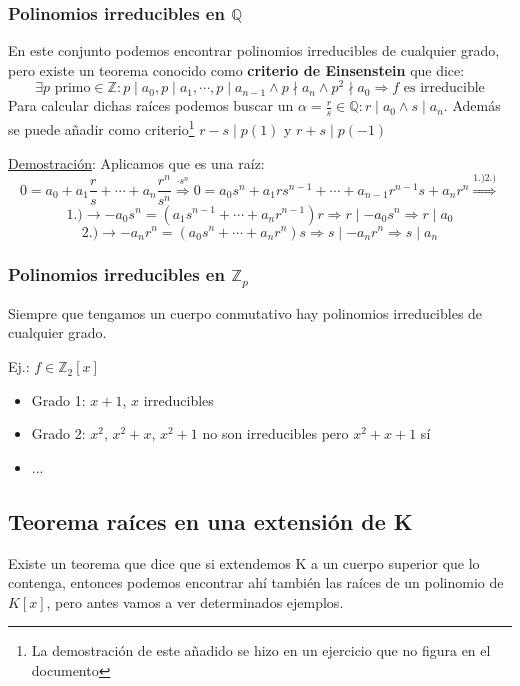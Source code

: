 \documentclass[10pt,a4paper,openright]{book}
\theoremstyle{break}
\begin{document}
\subsubsection*{Polinomios irreducibles en $\mathbb Q$}
En este conjunto podemos encontrar polinomios irreducibles de cualquier grado, pero existe un teorema conocido como \textbf{criterio de Einsenstein} que dice:
$$\exists p\mbox{ primo}\in \mathbb Z: p\mid a_0, p\mid a_1,\cdots, p\mid a_{n-1}\wedge p\nmid a_n \wedge p^2\nmid a_0\Rightarrow f\mbox{ es irreducible}$$
Para calcular dichas raíces podemos buscar un $\alpha=\frac{r}{s}\in \mathbb Q: r\mid a_0\wedge s\mid a_n$. Además se puede añadir como criterio\footnote{La demostración de este añadido se hizo en un ejercicio que no figura en el documento} $r-s\mid p(1)$ y $r+s\mid p(-1)$\par
\underline{Demostración}:
Aplicamos que es una raíz:
$$0=a_0+a_1\frac{r}{s}+\cdots+a_n\frac{r^n}{s^n}\stackrel{\cdot s^n}{\Rightarrow}0=a_0s^n+a_1rs^{n-1}+\cdots+a_{n-1}r^{n-1}s+a_nr^n\stackrel{1.)2.)}{\Rightarrow}$$
$$\mbox{1.)}\rightarrow -a_0s^n=(a_1s^{n-1}+\cdots+a_nr^{n-1})r\Rightarrow r\mid -a_0s^n\Rightarrow r\mid a_0$$
$$\mbox{2.)}\rightarrow -a_nr^n=(a_0s^n+\cdots+a_nr^{n})s\Rightarrow s\mid -a_nr^n\Rightarrow s\mid a_n$$

\subsubsection*{Polinomios irreducibles en $\mathbb Z_p$}
Siempre que tengamos un cuerpo conmutativo hay polinomios irreducibles de cualquier grado.\par
Ej.: $f\in \mathbb Z_2[x]$
\begin{itemize}
\item Grado 1: $x+1$, $x$ irreducibles
\item Grado 2: $x^2$, $x^2+x$, $x^2+1$ no son irreducibles pero $x^2+x+1$ sí
\item ...
\end{itemize}

\subsection{Teorema raíces en una extensión de K}
Existe un teorema que dice que si extendemos K a un cuerpo superior que lo contenga, entonces podemos encontrar ahí también las raíces de un polinomio de $K[x]$, pero antes vamos a ver determinados ejemplos.
\end{document}
